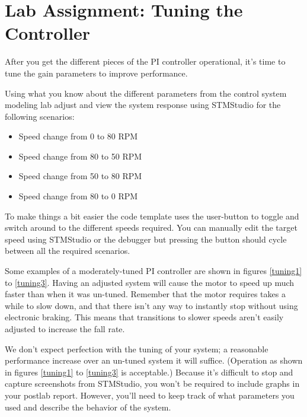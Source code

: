 \documentclass[openany,11pt,fleqn]{book} %
\begin{document}

\section{\color{blue}Lab Assignment: Tuning the Controller}

After you get the different pieces of the PI controller operational, it's time to tune the gain parameters to improve performance.

\begin{exercise}Using what you know about the different parameters from the control system modeling lab adjust and view the system response using STMStudio for the following scenarios:

\begin{itemize}
    \item Speed change from 0 to 80 RPM
    \item Speed change from 80 to 50 RPM
    \item Speed change from 50 to 80 RPM
    \item Speed change from 80 to 0 RPM 
\end{itemize}
To make things a bit easier the code template uses the user-button to toggle and switch around to the different speeds required. You can manually edit the target speed using STMStudio or the debugger but pressing the button should cycle between all the required scenarios. 




Some examples of a moderately-tuned PI controller are shown in figures \ref{tuning1} to \ref{tuning3}. Having an adjusted system will cause the motor to speed up much faster than when it was un-tuned. Remember that the motor requires takes a while to slow down, and that there isn't any way to instantly stop without using electronic braking. This means that transitions to slower speeds aren't easily adjusted to increase the fall rate. 




We don't expect perfection with the tuning of your system; a reasonable performance increase over an un-tuned system it will suffice. (Operation as shown in figures \ref{tuning1} to \ref{tuning3} is acceptable.) Because it's difficult to stop and capture screenshots from STMStudio, you won't be required to include graphs in your postlab report. However, you'll need to keep track of what parameters you used and describe the behavior of the system. 

\end{exercise}
\end{document}
